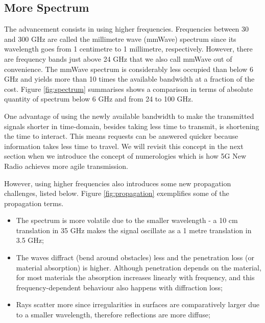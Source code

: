 \subsection*{More Spectrum}

The advancement consists in using higher frequencies. Frequencies between 30 and 300 GHz are called the millimetre wave (mmWave) spectrum since its wavelength goes from 1 centimetre to 1 millimetre, respectively. However, there are frequency bands just above 24 GHz that we also call mmWave out of convenience. The mmWave spectrum is considerably less occupied than below 6 GHz and yields more than 10 times the available bandwidth at a fraction of the cost. Figure \ref{fig:spectrum} summarises shows a comparison in terms of absolute quantity of spectrum below 6 GHz and from 24 to 100 GHz.


One advantage of using the newly available bandwidth to make the transmitted signals shorter in time-domain, besides taking less time to transmit, is shortening the time to interact. This means requests can be answered quicker because information takes less time to travel. We will revisit this concept in the next section when we introduce the concept of numerologies which is how 5G New Radio achieves more agile transmission.

However, using higher frequencies also introduces some new propagation challenges, listed below. Figure \ref{fig:propagation} exemplifies some of the propagation terms.

\begin{itemize}
    \item The spectrum is more volatile due to the smaller wavelength - a 10 cm translation in 35 GHz makes the signal oscillate as a 1 metre translation in 3.5 GHz;
    \item The waves diffract (bend around obstacles) less and the penetration loss (or material absorption) is higher. Although penetration depends on the material, for most materials the absorption increases linearly with frequency, and this frequency-dependent behaviour also happens with diffraction loss;
    \item Rays scatter more since irregularities in surfaces are comparatively larger due to a smaller wavelength, therefore reflections are more diffuse;
\end{itemize}

